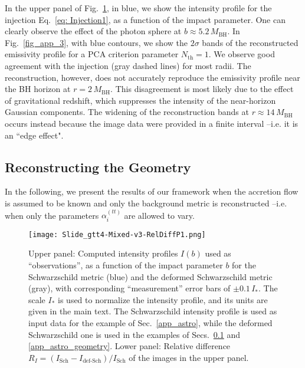 \documentclass[%
nofootinbib,
 amsmath,amssymb,
 aps,
floatfix,
twocolumn
]{revtex4-2}
\begin{document}
In the upper panel of Fig.~\ref{fig_app_1}, in blue, we show the intensity profile for the injection Eq.~\eqref{eq: Injection1}, as a function of the impact parameter. 
One can clearly observe the effect of the photon sphere at \(b \approx 5.2 \, M_\text{BH}\). 
In Fig.~\ref{fig_app_3}, with blue contours, we show the \(2\sigma\) bands of the reconstructed emissivity profile for a PCA criterion parameter \(N_\text{th} = 1\). We observe good agreement with the injection  (gray dashed lines) for  most radii. The reconstruction, however, does not accurately reproduce the emissivity profile near the BH horizon at \(r = 2 \, M_\text{BH}\). This disagreement is most likely due to the effect of gravitational redshift, which suppresses the intensity of the near-horizon Gaussian components. The widening of the reconstruction bands
at \(r \approx 14 \, M_\text{BH}\) occurs instead because the image data were provided in a finite interval --i.e. it is an ``edge effect".

\subsection{Reconstructing the Geometry}\label{app_geometry}

In the following, we present the results of our framework when the accretion flow is assumed to be known and only the background metric is reconstructed --i.e. when only the parameters \(\alpha^{(tt)}_i\) are allowed to vary. 

\begin{figure}[]
\texttt{[image: Slide\_gtt4-Mixed-v3-RelDiffP1.png]}
\caption{Upper panel: Computed intensity profiles $I(b)$  used as ``observations'', as a function of the impact parameter $b$ for the Schwarzschild metric (blue) and the deformed Schwarzschild metric (gray), with corresponding ``measurement'' error bars  of \(\pm 0.1 \, I_{*}\). The scale \(I_{*}\) is used to normalize the intensity profile, and its units are given in the main text. The Schwarzschild intensity profile is used as input data for the example of Sec.~\ref{app_astro}, while the deformed Schwarzschild one is used in the examples of Secs.~\ref{app_geometry} and \ref{app_astro_geometry}. 
%
Lower panel: Relative difference \( R_I =   \left(I_\text{Sch} -I_\text{def-Sch}  \right)/I_\text{Sch}  \) of the images in the upper panel. \label{fig_app_1}}
\end{figure}
\end{document}
